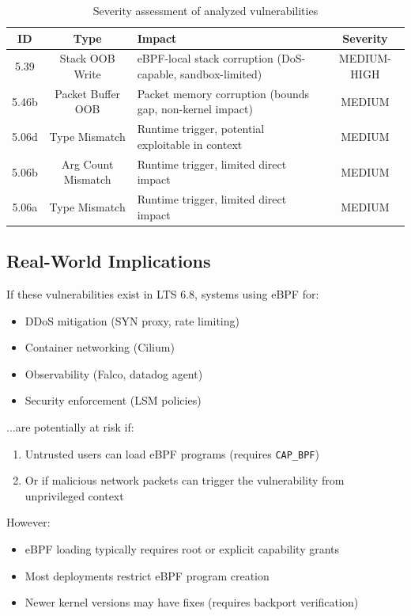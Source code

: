 \begin{table}[h]
\centering
\begin{tabular}{|c|c|l|c|}
\hline
\textbf{ID} & \textbf{Type} & \textbf{Impact} & \textbf{Severity} \\
\hline
5.39 & Stack OOB Write & eBPF-local stack corruption (DoS-capable, sandbox-limited) & MEDIUM-HIGH \\
5.46b & Packet Buffer OOB & Packet memory corruption (bounds gap, non-kernel impact) & MEDIUM \\
5.06d & Type Mismatch & Runtime trigger, potential exploitable in context & MEDIUM \\
5.06b & Arg Count Mismatch & Runtime trigger, limited direct impact & MEDIUM \\
5.06a & Type Mismatch & Runtime trigger, limited direct impact & MEDIUM \\
\hline
\end{tabular}
\caption{Severity assessment of analyzed vulnerabilities}
\end{table}

\subsection{Real-World Implications}

If these vulnerabilities exist in LTS 6.8, systems using eBPF for:
\begin{itemize}
  \item DDoS mitigation (SYN proxy, rate limiting)
  \item Container networking (Cilium)
  \item Observability (Falco, datadog agent)
  \item Security enforcement (LSM policies)
\end{itemize}

...are potentially at risk if:
\begin{enumerate}[label=\arabic*.]
  \item Untrusted users can load eBPF programs (requires \texttt{CAP\_BPF})
  \item Or if malicious network packets can trigger the vulnerability from unprivileged context
\end{enumerate}

However:
\begin{itemize}
  \item eBPF loading typically requires root or explicit capability grants
  \item Most deployments restrict eBPF program creation
  \item Newer kernel versions may have fixes (requires backport verification)
\end{itemize}

